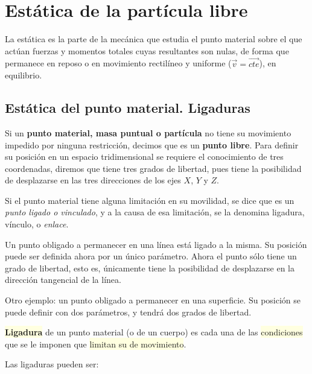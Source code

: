 \chapter{Estática de la partícula libre}	


\begin{miparrafo}
La estática es la parte de la mecánica que estudia el punto material sobre el que actúan fuerzas y momentos totales  cuyas resultantes son nulas, de forma que permanece en reposo o en movimiento rectilíneo y uniforme ($\vec v=\overrightarrow{cte}$), en equilibrio.	
\end{miparrafo}


\section{Estática del punto material. Ligaduras}

Si un \textbf{punto material, masa puntual o partícula} no tiene su movimiento impedido por ninguna restricción, decimos que es un \textbf{punto libre}. Para definir su posición en un espacio tridimensional se requiere el conocimiento de tres coordenadas, diremos que tiene tres grados de libertad, pues tiene la posibilidad de desplazarse en las tres direcciones de los ejes $X$, $Y$ y $Z$. 

Si el punto material tiene alguna limitación en su movilidad, se dice que es un \emph{punto ligado o vinculado}, y a la causa de esa limitación, se la denomina ligadura, vínculo, o \emph{enlace}.

Un punto obligado a permanecer en una línea está ligado a la misma. Su posición puede ser definida ahora por un único parámetro. Ahora el punto sólo tiene un grado de libertad, esto es, únicamente tiene la posibilidad de desplazarse en la dirección tangencial de la línea. 

Otro ejemplo: un punto obligado a permanecer en una superficie. Su posición se puede definir con dos parámetros, y tendrá dos grados de libertad. 


\colorbox{LightYellow}{\textbf{Ligadura}} de un punto material (o de un cuerpo) es cada una de las \colorbox{LightYellow}{condiciones} que se le imponen que \colorbox{LightYellow}{limitan su de movimiento}.

\vspace{4mm} %
Las ligaduras pueden ser:

